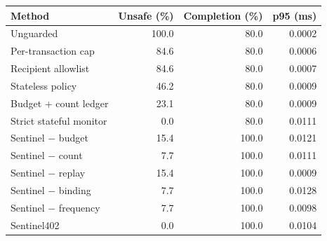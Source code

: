 \begin{tabular}{lrrr}
\hline
Method & Unsafe (\%) & Completion (\%) & p95 (ms) \\
\hline
Unguarded & 100.0 & 80.0 & 0.0002 \\
Per-transaction cap & 84.6 & 80.0 & 0.0006 \\
Recipient allowlist & 84.6 & 80.0 & 0.0007 \\
Stateless policy & 46.2 & 80.0 & 0.0009 \\
Budget + count ledger & 23.1 & 80.0 & 0.0009 \\
Strict stateful monitor & 0.0 & 80.0 & 0.0111 \\
Sentinel $-$ budget & 15.4 & 100.0 & 0.0121 \\
Sentinel $-$ count & 7.7 & 100.0 & 0.0111 \\
Sentinel $-$ replay & 15.4 & 100.0 & 0.0009 \\
Sentinel $-$ binding & 7.7 & 100.0 & 0.0128 \\
Sentinel $-$ frequency & 7.7 & 100.0 & 0.0098 \\
Sentinel402 & 0.0 & 100.0 & 0.0104 \\
\hline
\end{tabular}
